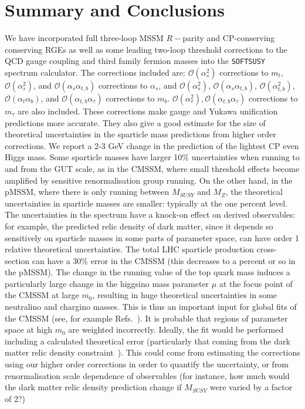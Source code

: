 \documentclass[final,3p,times,pdflatex]{elsarticle}
\begin{document}
\section{Summary and Conclusions}
 We have incorporated full three-loop MSSM $R-$parity and CP-conserving
 conserving RGEs as well as some leading two-loop 
 threshold corrections to the QCD gauge coupling and third family fermion
 masses into the {\tt SOFTSUSY} spectrum calculator. The corrections included
 are: $\mathcal O(\alpha_s^2)$ corrections to $m_t$, $\mathcal O(\alpha_s^2)$,
 and $\mathcal O(\alpha_s \alpha_{t,b})$ 
 corrections to $\alpha_s$, and $\mathcal O(\alpha_s^2)$, 
 $\mathcal O(\alpha_s \alpha_{t,b})$, $\mathcal O(\alpha_{t,b}^2)$, $\mathcal O(\alpha_t \alpha_b)$, and $\mathcal O(\alpha_{t,b} \alpha_\tau)$ corrections to
 $m_b$. $\mathcal O(\alpha_\tau^2), \mathcal O(\alpha_{t,b} \alpha_\tau)$ 
 corrections to $m_\tau$ are also included. These corrections make gauge and
 Yukawa unification  predictions more accurate. They also give a good estimate
 for the size of theoretical uncertainties in the sparticle mass predictions
 from higher order corrections. We report a 2-3 GeV change in
 the prediction  of 
 the lightest CP even Higgs mass. Some sparticle masses have larger 10$\%$
 uncertainties when running to and from the GUT scale, as in the CMSSM, where
 small threshold effects become amplified by sensitive renormalisation group
 running. On the other hand, in the pMSSM, where there is only running between
 $M_{SUSY}$ and $M_Z$, the theoretical uncertainties in sparticle masses are
 smaller: typically at the one percent level. The uncertainties in the spectrum
 have a knock-on effect on derived observables: for example, the predicted
 relic density of dark matter, since it depends so sensitively on sparticle
 masses in some parts of parameter space, can have order 1 relative theoretical
 uncertainties. The total LHC sparticle production cross-section can have a
 $30\%$ error in the CMSSM (this decreases to a percent or so in the pMSSM).
 The change in the running
 value of the top quark mass induces a particularly large change in the
 higgsino mass parameter $\mu$ at the focus point of the CMSSM at large $m_0$,
 resulting in 
 huge theoretical uncertainties in some neutralino and chargino masses. 
 This is thus an important input for global fits of the CMSSM (see, for example
Refs.~\cite{Buchmueller:2011ab,Allanach:2011wi,Roszkowski:2014wqa,Fowlie:2013oua}). It 
is probable that regions of parameter space at high 
$m_0$ are weighted 
incorrectly. Ideally, the fit would be performed including a calculated
 theoretical error (particularly that coming from the dark matter relic
 density constraint~\cite{Belanger:2005jk}). This could come from estimating
 the corrections using  
 our higher order corrections in order to quantify the uncertainty, or from
 renormalisation scale dependence of observables (for instance, how much would
 the dark matter relic density prediction change if $M_{SUSY}$ were varied by
 a factor of 2?)
\end{document}
